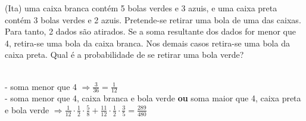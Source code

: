 \begin{ex}
(Ita) uma caixa branca contém 5 bolas verdes e 3 azuis, e uma caixa preta contém 3 bolas verdes e 2 azuis. Pretende-se retirar uma bola de uma das caixas. Para tanto, 2 dados são atirados. Se a soma resultante dos dados for menor que 4, retira-se uma bola da caixa branca. Nos demais casos retira-se uma bola da caixa preta. Qual é a probabilidade de se retirar uma bola verde?
 \begin{sol}
  \phantom{A} \\
  - soma menor que 4 $\Longrightarrow \frac{3}{36}=\frac{1}{12}$ \\
  - soma menor que 4, caixa branca e bola verde \textbf{ou} soma maior que 4, caixa preta e bola verde 
  $\Longrightarrow\frac{1}{12}\cdot\frac{1}{2}\cdot\frac{5}{8}+\frac{11}{12}\cdot\frac{1}{2}\cdot\frac{3}{5}=\frac{289}{480}$
 \end{sol}
\end{ex}